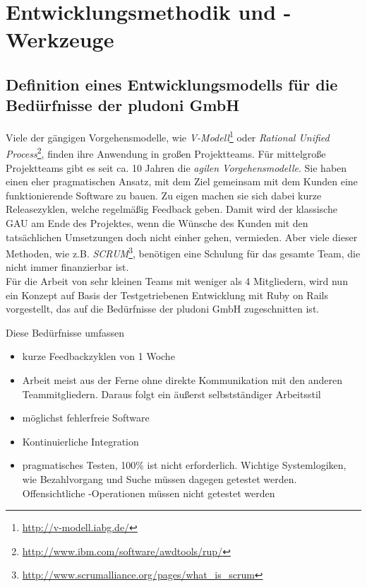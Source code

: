 \chapter{Entwicklungsmethodik und -Werkzeuge}
\label{sec:auswahl}
\section{Definition eines Entwicklungsmodells für die Bedürfnisse der pludoni GmbH}
Viele der gängigen Vorgehensmodelle, wie \textit{V-Modell}\footnote{\url{http://v-modell.iabg.de/}} oder \textit{Rational Unified Process}\footnote{\url{http://www.ibm.com/software/awdtools/rup/}}, finden ihre Anwendung in großen Projektteams. Für mittelgroße Projektteams gibt es seit ca. 10 Jahren die \textit{agilen Vorgehensmodelle}. Sie haben einen eher pragmatischen Ansatz, mit dem Ziel gemeinsam mit dem Kunden eine funktionierende Software zu bauen. Zu eigen machen sie sich dabei kurze Releasezyklen, welche regelmäßig Feedback geben. Damit wird der klassische GAU am Ende des Projektes, wenn die Wünsche des Kunden mit den tatsächlichen Umsetzungen doch nicht einher gehen, vermieden. Aber viele dieser Methoden, wie z.B. \textit{SCRUM}\footnote{\url{http://www.scrumalliance.org/pages/what_is_scrum}}, benötigen eine Schulung für das gesamte Team, die nicht immer finanzierbar ist.\\
Für die Arbeit von sehr kleinen Teams mit weniger als 4 Mitgliedern, wird nun ein Konzept auf Basis der Testgetriebenen Entwicklung mit Ruby on Rails vorgestellt, das auf die Bedürfnisse der pludoni GmbH zugeschnitten ist.

Diese Bedürfnisse umfassen
\begin{itemize}
 \item kurze Feedbackzyklen von 1 Woche
 \item Arbeit meist aus der Ferne ohne direkte Kommunikation mit den anderen Teammitgliedern. Daraus folgt ein äußerst selbstständiger Arbeitsstil
 \item möglichst fehlerfreie Software
 \item Kontinuierliche Integration
 \item pragmatisches Testen, 100\%  ist nicht erforderlich. Wichtige Systemlogiken, wie Bezahlvorgang und Suche müssen dagegen getestet werden. Offensichtliche -Operationen müssen nicht getestet werden

\end{itemize}

